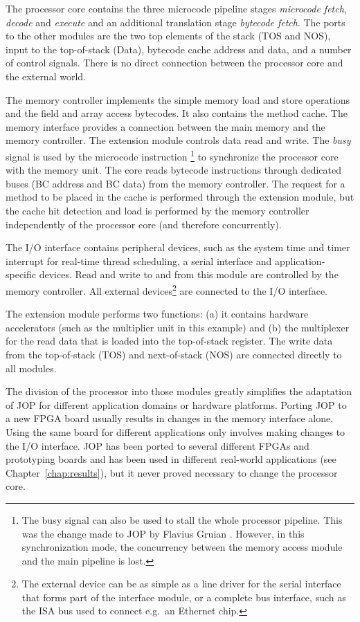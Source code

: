 The processor core contains the three microcode pipeline stages
\emph{microcode fetch}, \emph{decode} and \emph{execute} and an
additional translation stage \emph{bytecode fetch}. The ports to the
other modules are the two top elements of the stack (TOS and NOS),
input to the top-of-stack (Data), bytecode cache address and data,
and a number of control signals. There is no direct connection
between the processor core and the external world.

The memory controller implements the simple memory load and store
operations and the field and array access bytecodes. It also contains
the method cache. The memory interface provides a connection between
the main memory and the memory controller. The extension module
controls data read and write. The \emph{busy} signal is used by the
microcode instruction \footnote{The busy signal can also
be used to stall the whole processor pipeline. This was the change
made to JOP by Flavius Gruian \cite{jop:sac05}. However, in this
synchronization mode, the concurrency between the memory access
module and the main pipeline is lost.} to synchronize the processor
core with the memory unit. The core reads bytecode instructions
through dedicated buses (BC address and BC data) from the memory
controller. The request for a method to be placed in the cache is
performed through the extension module, but the cache hit detection
and load is performed by the memory controller independently of the
processor core (and therefore concurrently).

The I/O interface contains peripheral devices, such as the system
time and timer interrupt for real-time thread scheduling, a serial
interface and application-specific devices. Read and write to and
from this module are controlled by the memory controller. All
external devices\footnote{The external device can be as simple as a
line driver for the serial interface that forms part of the interface
module, or a complete bus interface, such as the ISA bus used to
connect e.g.\ an Ethernet chip.} are connected to the I/O interface.

The extension module performs two functions: (a) it contains hardware
accelerators (such as the multiplier unit in this example) and (b)
the multiplexer for the read data that is loaded into the
top-of-stack register. The write data from the top-of-stack (TOS) and
next-of-stack (NOS) are connected directly to all modules.

The division of the processor into those modules greatly simplifies
the adaptation of JOP for different application domains or hardware
platforms. Porting JOP to a new FPGA board usually results in changes
in the memory interface alone. Using the same board for different
applications only involves making changes to the I/O interface. JOP
has been ported to several different FPGAs and prototyping boards and
has been used in different real-world applications (see
Chapter~\ref{chap:results}), but it never proved necessary to change
the processor core.

